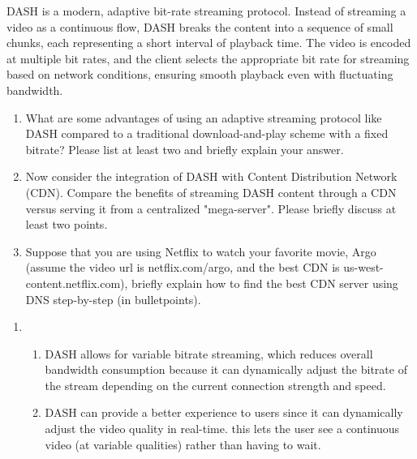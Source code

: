 \documentclass{report}
\begin{document}
\begin{problem}
DASH is a modern, adaptive bit-rate streaming protocol. Instead of streaming a video as a continuous flow, DASH breaks the content into a sequence of small chunks, each representing a short interval of playback time. The video is encoded at multiple bit rates, and the client selects the appropriate bit rate for streaming based on network conditions, ensuring smooth playback even with fluctuating bandwidth.
\begin{enumerate}
\item What are some advantages of using an adaptive streaming protocol like DASH compared to a traditional download-and-play scheme with a fixed bitrate? Please list at least two and briefly explain your answer. 
\item Now consider the integration of DASH with Content Distribution Network (CDN). Compare the benefits of streaming DASH content through a CDN versus serving it from a centralized "mega-server". Please briefly discuss at least two points.
\item Suppose that you are using Netflix to watch your favorite movie, Argo (assume the video url is netflix.com/argo, and the best CDN is us-west-content.netflix.com), briefly explain how to find the best CDN server using DNS step-by-step (in bulletpoints).

\end{enumerate}

\begin{answer}{40em}
  \begin{enumerate}[label=(\alph*)]
  \item
    \begin{enumerate}[label=\textit{(\roman*)}]
    \item DASH allows for variable bitrate streaming, which reduces overall bandwidth consumption
      because it can dynamically adjust the bitrate of the stream depending on the current
      connection strength and speed.
    \item DASH can provide a better experience to users since it can dynamically adjust the video
      quality in real-time. this lets the user see a continuous video (at variable qualities) rather than
      having to wait.
    \end{enumerate}


\end{enumerate}
\end{answer}
\end{problem}
\end{document}
